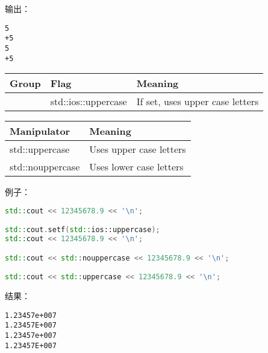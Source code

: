\documentclass[../../LearnCpp.tex]{subfiles}
\begin{document}
输出：

\begin{lstlisting}
5
+5
5
+5
\end{lstlisting}

\begin{center}
  \begin{tiny}
    \begin{tabularx}{ 1\textwidth}{
        | >{\raggedright\arraybackslash}X
        | >{\raggedright\arraybackslash}X
        | >{\raggedright\arraybackslash}X |
      }
      \hline
      Group & Flag                & Meaning                         \\
      \hline
            & std::ios::uppercase & If set, uses upper case letters \\
      \hline
    \end{tabularx}
  \end{tiny}
\end{center}

\begin{center}
  \begin{tiny}
    \begin{tabularx}{ 1\textwidth}{
        | >{\raggedright\arraybackslash}X
        | >{\raggedright\arraybackslash}X |
      }
      \hline
      Manipulator      & Meaning                 \\
      \hline
      std::uppercase   & Uses upper case letters \\
      std::nouppercase & Uses lower case letters \\
      \hline
    \end{tabularx}
  \end{tiny}
\end{center}

例子：

\begin{lstlisting}[language=C++]
std::cout << 12345678.9 << '\n';

std::cout.setf(std::ios::uppercase);
std::cout << 12345678.9 << '\n';

std::cout << std::nouppercase << 12345678.9 << '\n';

std::cout << std::uppercase << 12345678.9 << '\n';
\end{lstlisting}

结果：

\begin{lstlisting}
1.23457e+007
1.23457E+007
1.23457e+007
1.23457E+007
\end{lstlisting}
\end{document}
